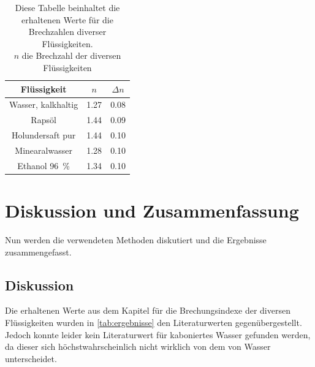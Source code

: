 \documentclass[11pt,ngerman]{scrartcl}
\begin{document}
\begin{table}[H]
    \centering
    \caption{Diese Tabelle beinhaltet die erhaltenen Werte für
        die Brechzahlen diverser Flüssigkeiten. \\
    $n$ die Brechzahl der diversen Flüssigkeiten \\
}
    \label{tab:ausgewertet}
    \begin{tabular}{c|S|S}
        Flüssigkeit          & {$n$} & {$\Delta n$} \\ \hline
        Wasser, kalkhaltig   & 1.27  & 0.08         \\
        Rapsöl               & 1.44  & 0.09         \\
        Holundersaft pur     & 1.44  & 0.10         \\
        Minearalwasser      & 1.28  & 0.10         \\
        Ethanol \SI{96}{\percent}      & 1.34  & 0.10         \\
    \end{tabular}
\end{table}

\section{Diskussion und Zusammenfassung}
\label{sec:diskussion_zusammenfassung}

Nun werden die verwendeten Methoden diskutiert und die Ergebnisse 
zusammengefasst.

\subsection{Diskussion}
Die erhaltenen Werte aus dem Kapitel  
für die Brechungsindexe der diversen Flüssigkeiten wurden
in \autoref{tab:ergebnisse} den Literaturwerten gegenübergestellt.
Jedoch konnte leider kein Literaturwert für kaboniertes Wasser 
gefunden werden, da dieser sich höchstwahrscheinlich nicht wirklich von
dem von Wasser unterscheidet.
\end{document}
